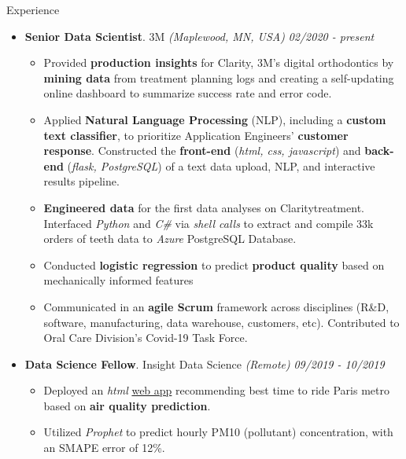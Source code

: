 \documentclass{resume} %
\begin{document}
	
	\begin{rSection}{Experience}
		
		\begin{itemize}[leftmargin=0em]
			
			\item {\bf Senior Data Scientist}{. 3M \textit{(Maplewood, MN, USA)}} \hfill {\em 02/2020 - present}\\
			\vspace{-5mm}
			\begin{itemize}
				\setlength\itemsep{-1.75em}			
				\item Provided \textbf{production insights} for Clarity\texttrademark, 3M's digital orthodontics  by \textbf{mining data} from treatment planning logs and creating a self-updating online dashboard to summarize success rate and error code.\\
				\item Applied \textbf{Natural Language Processing} (NLP), including a \textbf{custom text classifier}, to prioritize Application Engineers' \textbf{customer response}. Constructed the \textbf{front-end} (\textit{html, css, javascript}) and \textbf{back-end} (\textit{flask, PostgreSQL}) of a text data upload, NLP, and interactive results pipeline.\\
				\item \textbf{Engineered data} for the first data analyses on Clarity\texttrademark treatment. Interfaced \textit{Python} and \textit{C\#} via \textit{shell calls} to extract and compile 33k orders of teeth data to \textit{Azure} PostgreSQL Database.\\
				\item Conducted \textbf{logistic regression} to predict \textbf{product quality} based on mechanically informed features\\
				\item Communicated in an \textbf{agile Scrum} framework across disciplines (R\&D, software, manufacturing, data warehouse, customers, etc). Contributed to Oral Care Division's Covid-19 Task Force.
			\end{itemize}	
		
			\item {\bf Data Science Fellow}{. Insight Data Science \textit{(Remote)}} \hfill {\em 09/2019 - 10/2019}\\
			\vspace{-5mm}
			\begin{itemize}
				\setlength\itemsep{-1.75em}
				\item Deployed an \textit{html} \href{https://aety.github.io/my-first-web-app}{web app} recommending best time to ride Paris metro based on \textbf{air quality prediction}.\\
				\item Utilized \textit{Prophet} to predict hourly PM10 (pollutant) concentration, with an SMAPE error of 12\%.
			\end{itemize}	
			

\end{itemize}
\end{rSection}
\end{document}
